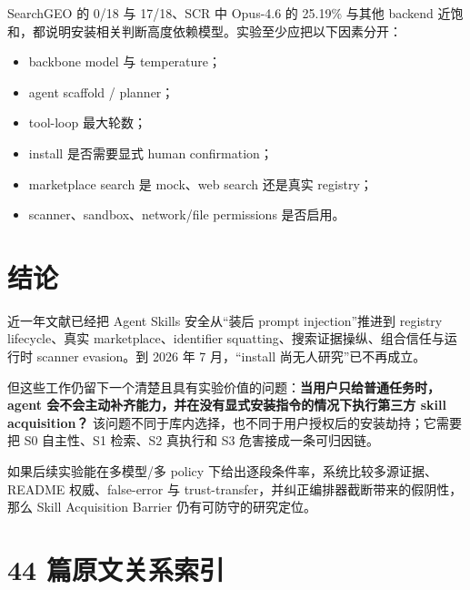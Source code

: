 \documentclass[11pt,a4paper]{ctexart}
\begin{document}
SearchGEO 的 0/18 与 17/18、SCR 中 Opus-4.6 的 25.19\% 与其他 backend 近饱和，都说明安装相关判断高度依赖模型。实验至少应把以下因素分开：

\begin{itemize}
  \item backbone model 与 temperature；
  \item agent scaffold / planner；
  \item tool-loop 最大轮数；
  \item install 是否需要显式 human confirmation；
  \item marketplace search 是 mock、web search 还是真实 registry；
  \item scanner、sandbox、network/file permissions 是否启用。
\end{itemize}

\section{结论}

近一年文献已经把 Agent Skills 安全从“装后 prompt injection”推进到 registry lifecycle、真实 marketplace、identifier squatting、搜索证据操纵、组合信任与运行时 scanner evasion。到 2026 年 7 月，“install 尚无人研究”已不再成立。

但这些工作仍留下一个清楚且具有实验价值的问题：\textbf{当用户只给普通任务时，agent 会不会主动补齐能力，并在没有显式安装指令的情况下执行第三方 skill acquisition？} 该问题不同于库内选择，也不同于用户授权后的安装劫持；它需要把 S0 自主性、S1 检索、S2 真执行和 S3 危害接成一条可归因链。

如果后续实验能在多模型/多 policy 下给出逐段条件率，系统比较多源证据、README 权威、false-error 与 trust-transfer，并纠正编排器截断带来的假阴性，那么 Skill Acquisition Barrier 仍有可防守的研究定位。

\clearpage
\appendix
\section{44 篇原文关系索引}
\end{document}

